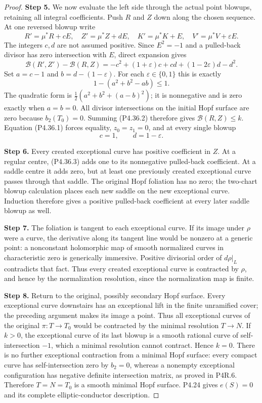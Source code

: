 \begin{proof}
\noindent\textbf{Step 5.} We now evaluate the left side through the actual
point blowups, retaining all integral coefficients.
Push $R$ and $Z$ down along the chosen sequence.
At one reversed blowup write
\[
 R'=\mu^*R+cE,\quad Z'=\mu^*Z+dE,
 \quad K'=\mu^*K+E,\quad V'=\mu^*V+\varepsilon E.
\]
The integers $c,d$ are not assumed positive.
Since $E^2=-1$ and a pulled-back divisor has zero
intersection with $E$, direct expansion gives
\[
 \mathcal B(R',Z')-\mathcal B(R,Z)
 =-c^2+(1+\varepsilon)c+cd+(1-2\varepsilon)d-d^2.
\]
Set $a=c-1$ and $b=d-(1-\varepsilon)$. For each
$\varepsilon\in\{0,1\}$ this is exactly
\[
 1-(a^2+b^2-ab)\le1.                            \tag{P4.36.2}
\]
The quadratic form is
$\frac12(a^2+b^2+(a-b)^2)$; it is nonnegative
and is zero exactly when $a=b=0$.
All divisor intersections on the initial Hopf
surface are zero because $b_2(T_0)=0$.
Summing (P4.36.2) therefore gives
$\mathcal B(R,Z)\le k$.
Equation (P4.36.1) forces equality, $z_0=z_1=0$,
and at every single blowup
\[
 c=1,\qquad d=1-\varepsilon.                    \tag{P4.36.3}
\]

\noindent\textbf{Step 6.} Every created exceptional curve has positive
coefficient in $Z$. At a regular centre, (P4.36.3)
adds one to its nonnegative pulled-back coefficient.
At a saddle centre it adds zero, but at least one
previously created exceptional curve passes through
that saddle. The original Hopf foliation has no
zero; the two-chart blowup calculation places each
new saddle on the new exceptional curve. Induction
therefore gives a positive pulled-back coefficient
at every later saddle blowup as well.

\noindent\textbf{Step 7.} The foliation is tangent to each exceptional curve.
If its image under $\rho$ were a curve, the derivative
along its tangent line would be nonzero at a generic
point: a nonconstant holomorphic map of smooth
normalized curves in characteristic zero is
generically immersive. Positive divisorial order
of $d\rho|_L$ contradicts that fact. Thus every
created exceptional curve is contracted by $\rho$,
and hence by the normalization resolution, since
the normalization map is finite.

\noindent\textbf{Step 8.} Return to the original, possibly secondary Hopf
surface. Every exceptional curve downstairs has
an exceptional lift in the finite unramified cover;
the preceding argument makes its image a point.
Thus all exceptional curves of the original
$\pi:T\to T_0$ would be contracted by the minimal
resolution $T\to N$. If $k>0$, the exceptional curve
of its last blowup is a smooth rational curve of
self-intersection $-1$, which a minimal resolution
cannot contract. Hence $k=0$.
There is no further exceptional contraction from
a minimal Hopf surface: every compact curve has
self-intersection zero by $b_2=0$, whereas a
nonempty exceptional configuration has negative
definite intersection matrix, as proved in P4R.6.
Therefore $T=N=T_0$ is a smooth minimal Hopf
surface. P4.24 gives $e(S)=0$ and its complete
elliptic-conductor description.
\end{proof}


